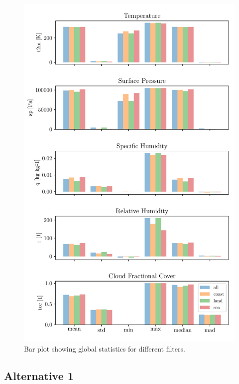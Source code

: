 \begin{figure}[ht]
    \centering
    \includegraphics{python_figs/bar_plot_global_statistics.pdf}
    \caption{Bar plot showing global statistics for different filters.}
    \label{fig:bar_plot_global_stats}
\end{figure}

\subsection{Alternative 1}


